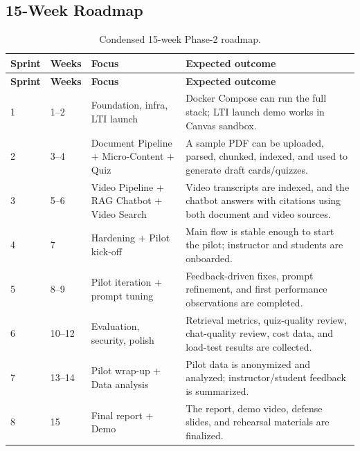 \subsection{15-Week Roadmap}
\label{subsec:overview-gd2}

\begin{longtable}{|p{1.5cm}|p{1.8cm}|p{4.2cm}|p{5.2cm}|}
    \caption{Condensed 15-week Phase-2 roadmap.}
    \label{tab:overview-gd2} \\
    \hline
    \textbf{Sprint} & \textbf{Weeks} & \textbf{Focus} & \textbf{Expected
    outcome} \\
    \hline
    \endfirsthead
    \hline
    \textbf{Sprint} & \textbf{Weeks} & \textbf{Focus} & \textbf{Expected
    outcome} \\
    \hline
    \endhead

    1 & 1--2 & Foundation, infra, LTI launch
      & Docker Compose can run the full stack; LTI launch demo works in
        Canvas sandbox. \\
    \hline
    2 & 3--4 & Document Pipeline + Micro-Content + Quiz
      & A sample PDF can be uploaded, parsed, chunked, indexed, and used
        to generate draft cards/quizzes. \\
    \hline
    3 & 5--6 & Video Pipeline + RAG Chatbot + Video Search
      & Video transcripts are indexed, and the chatbot answers with
        citations using both document and video sources. \\
    \hline
    4 & 7 & Hardening + Pilot kick-off
      & Main flow is stable enough to start the pilot; instructor and
        students are onboarded. \\
    \hline
    5 & 8--9 & Pilot iteration + prompt tuning
      & Feedback-driven fixes, prompt refinement, and first performance
        observations are completed. \\
    \hline
    6 & 10--12 & Evaluation, security, polish
      & Retrieval metrics, quiz-quality review, chat-quality review,
        cost data, and load-test results are collected. \\
    \hline
    7 & 13--14 & Pilot wrap-up + Data analysis
      & Pilot data is anonymized and analyzed; instructor/student
        feedback is summarized. \\
    \hline
    8 & 15 & Final report + Demo
      & The report, demo video, defense slides, and rehearsal materials
        are finalized. \\
    \hline
\end{longtable}

